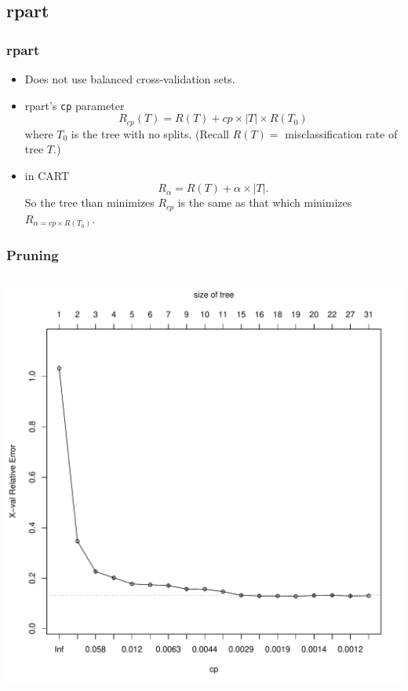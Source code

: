 \documentclass{beamer}
\begin{document}
\subsection{rpart}
\begin{frame}
	\frametitle{rpart}
	\begin{itemize}
		\item Does not use balanced cross-validation sets.
		\item rpart's \texttt{cp} parameter
		\[
			R_{cp}(T) = R(T) + cp \times |T| \times R(T_0)
		\]
		where $T_0$ is the tree with no splits. 	(Recall $R(T) =$ misclassification rate of tree $T$.)
		\item in CART
		\[
		R_\alpha = R(T) + \alpha \times |T|.
		\]
		So the tree than minimizes $R_{cp}$ is the same as that which minimizes $R_{\alpha = cp\times R(T_0)}$.
	\end{itemize}
\end{frame}

\begin{frame}
\frametitle{Pruning}
\begin{columns}[c] %
\includegraphics{cp.pdf}
	\end{columns}
\end{frame}
\end{document}
